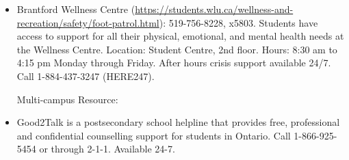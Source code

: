 \documentclass{article}
\begin{document}
\begin{enumerate}
\begin{itemize}
\item Brantford Wellness Centre (\url{https://students.wlu.ca/wellness-and-recreation/safety/foot-patrol.html}): 519-756-8228, x5803. Students have access to support for all their physical, emotional, and mental health needs at the Wellness Centre. Location: Student Centre, 2nd floor. Hours: 8:30 am to 4:15 pm Monday through Friday. After hours crisis support available 24/7. Call 1-884-437-3247 (HERE247). 

Multi-campus Resource:
\item 
Good2Talk is a postsecondary school helpline that provides free, professional and confidential counselling support for students in Ontario. Call 1-866-925-5454 or through 2-1-1. Available 24-7.
\end{itemize}
\end{enumerate}
\end{document}
